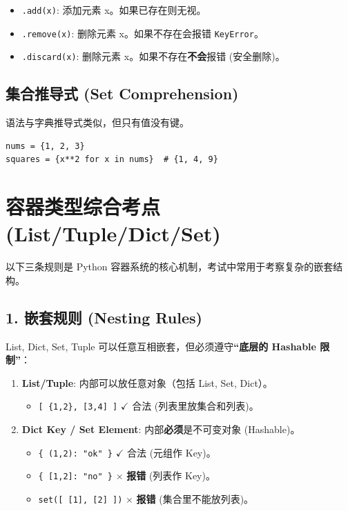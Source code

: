\documentclass[12pt, a4paper]{article}
\begin{document}
\begin{itemize}
    \item \texttt{.add(x)}: 添加元素 x。如果已存在则无视。
    \item \texttt{.remove(x)}: 删除元素 x。如果不存在会报错 \texttt{KeyError}。
    \item \texttt{.discard(x)}: 删除元素 x。如果不存在\textbf{不会}报错 (安全删除)。
\end{itemize}

\subsection{集合推导式 (Set Comprehension)}

语法与字典推导式类似，但只有值没有键。
\begin{lstlisting}
nums = {1, 2, 3}
squares = {x**2 for x in nums}  # {1, 4, 9}
\end{lstlisting}

\newpage
\section{容器类型综合考点 (List/Tuple/Dict/Set)}

以下三条规则是 Python 容器系统的核心机制，考试中常用于考察复杂的嵌套结构。

\subsection{1. 嵌套规则 (Nesting Rules)}

List, Dict, Set, Tuple 可以任意互相嵌套，但必须遵守\textbf{“底层的 Hashable 限制”}：

\begin{enumerate}
    \item \textbf{List/Tuple}: 内部可以放任意对象（包括 List, Set, Dict）。
    \begin{itemize}
        \item \texttt{[ \{1,2\}, [3,4] ]} $\checkmark$ 合法 (列表里放集合和列表)。
    \end{itemize}
    \item \textbf{Dict Key / Set Element}: 内部\textbf{必须}是不可变对象 (Hashable)。
    \begin{itemize}
        \item \texttt{\{ (1,2): "ok" \}} $\checkmark$ 合法 (元组作 Key)。
        \item \texttt{\{ [1,2]: "no" \}} $\times$ \textbf{报错} (列表作 Key)。
        \item \texttt{set([ [1], [2] ])} $\times$ \textbf{报错} (集合里不能放列表)。
    \end{itemize}
\end{enumerate}
\end{document}
